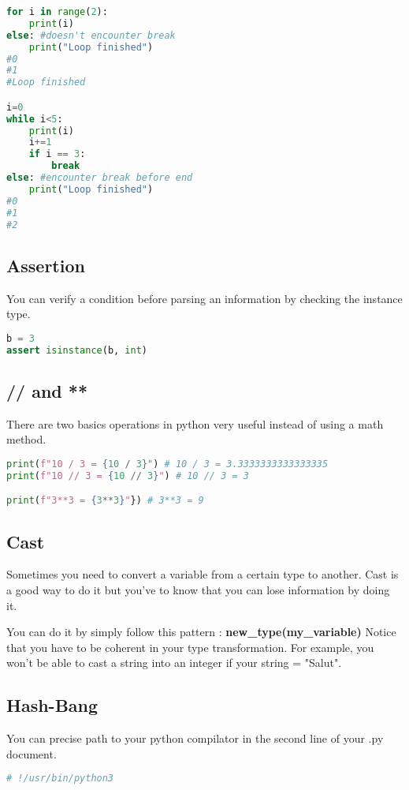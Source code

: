 \documentclass[a4paper, 12pt, titlepage]{scrartcl} %
\begin{document}
\begin{lstlisting}[language=Python]
for i in range(2):
    print(i)
else: #doesn't encounter break
    print("Loop finished")
#0
#1
#Loop finished

i=0
while i<5:
    print(i)
    i+=1
    if i == 3:
        break
else: #encounter break before end
    print("Loop finished")
#0
#1
#2
\end{lstlisting} \vspace{5mm}

\subsection{Assertion}
\label{subsec:Assertion}
You can verify a condition before parsing an information by checking the instance type.
\begin{lstlisting}[language=Python]
b = 3
assert isinstance(b, int)
\end{lstlisting} \vspace{5mm}

\subsection{// and **}
There are two basics operations in python very useful instead of using a math method.
\begin{lstlisting}[language=Python]
print(f"10 / 3 = {10 / 3}") # 10 / 3 = 3.3333333333333335
print(f"10 // 3 = {10 // 3}") # 10 // 3 = 3

print(f"3**3 = {3**3}"}) # 3**3 = 9
\end{lstlisting} \vspace{5mm}

\subsection{Cast}
Sometimes you need to convert a variable from a certain type to another. Cast is a good way to do it but you've to know that you can lose information by doing it. 

You can do it by simply follow this pattern : \textbf{new\_type(my\_variable)}
Notice that you have to be coherent in your type transformation. For example, you won't be able to cast a string into an integer if your string = "Salut".

\subsection{Hash-Bang}
You can precise path to your python compilator in the second line of your .py document.
\begin{lstlisting}[language=Python]
# !/usr/bin/python3
\end{lstlisting} \vspace{5mm}
\end{document}

